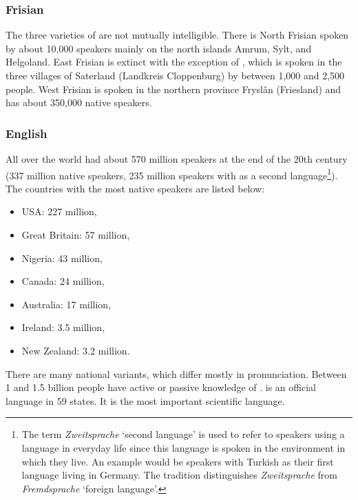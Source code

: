\subsubsection{Frisian}

The three varieties of  are not mutually intelligible. There is North Frisian spoken by
about 10,000 speakers mainly on the north  islands Amrum, Sylt, and Helgoland. East Frisian
is extinct with the exception of , which is spoken in the three villages of Saterland
(Landkreis Cloppenburg) by between 1,000 and 2,500 people.
West Frisian is spoken in the northern  province Fryslân (Friesland) and has about 350,000
native speakers.



\subsubsection{English}

All over the world  had about 570 million speakers at the end of the 20th century 
(337 million native speakers, 235 million speakers with  as a second language\footnote{%
  The term \emph{Zweitsprache} `second language' is used to refer to speakers using a language in
  everyday life since this language is spoken in the environment in which they live. An example would be speakers with
  Turkish as their first language living in Germany. The  tradition distinguishes
  \emph{Zweitsprache} from \emph{Fremdsprache} `foreign language'.%
}). The countries with the most native speakers are listed below: 
\begin{itemize}
\item USA: 227 million,
\item Great Britain: 57 million,
\item Nigeria: 43 million, 
\item Canada: 24 million,
\item Australia: 17 million,
\item Ireland: 3.5 million,
\item New Zealand: 3.2 million.
\end{itemize}
There are many national variants, which differ mostly in pronunciation.
Between 1 and 1.5 billion people have active or passive knowledge of .
 is an official language in 59 states. It is the most important scientific language.%




